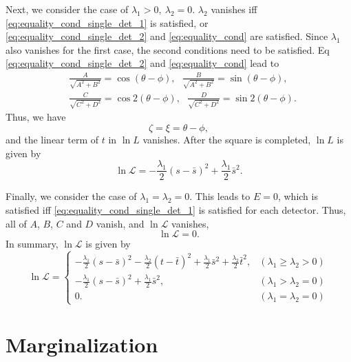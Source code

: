 \documentclass[12pt]{article}
\renewcommand{\L}{\mathcal{L}}
\begin{document}
Next, we consider the case of $\lambda_1>0,~\lambda_2=0$.
$\lambda_2$ vanishes iff \eqref{eq:equality_cond_single_det_1} is satisfied, or \eqref{eq:equality_cond_single_det_2} and \eqref{eq:equality_cond} are satisfied.
Since $\lambda_1$ also vanishes for the first case, the second conditions need to be satisfied.
Eq \eqref{eq:equality_cond_single_det_2} and \eqref{eq:equality_cond} lead to
\begin{align}
&\frac{A}{\sqrt{A^2+B^2}} = \cos (\theta - \phi),~~~\frac{B}{\sqrt{A^2+B^2}} = \sin (\theta - \phi), \\
&\frac{C}{\sqrt{C^2+D^2}} = \cos 2 (\theta - \phi),~~~\frac{D}{\sqrt{C^2+D^2}} = \sin 2 (\theta - \phi).
\end{align}
Thus, we have 
\begin{equation}
\zeta = \xi = \theta - \phi,
\end{equation}
and the linear term of $t$ in $\ln L$ vanishes.
After the square is completed, $\ln L$ is given by
\begin{equation}
\ln \L = - \frac{\lambda_1}{2} (s - \bar{s})^2 + \frac{\lambda_1}{2} \bar{s}^2.
\end{equation}

Finally, we consider the case of $\lambda_1=\lambda_2=0$. 
This leads to $E=0$, which is satisfied iff \eqref{eq:equality_cond_single_det_1} is satisfied for each detector.
Thus, all of $A$, $B$, $C$ and $D$ vanish, and $\ln \L$ vanishes,
\begin{equation}
\ln \L = 0.
\end{equation}
In summary, $\ln \L$ is given by
\begin{equation}
\ln \L = \begin{cases}
- \frac{\lambda_1}{2} (s - \bar{s})^2 - \frac{\lambda_2}{2} (t - \bar{t})^2 + \frac{\lambda_1}{2} \bar{s}^2 + \frac{\lambda_2}{2} \bar{t}^2, & (\lambda_1\geq\lambda_2>0) \\
- \frac{\lambda_1}{2} (s - \bar{s})^2 + \frac{\lambda_1}{2} \bar{s}^2, & (\lambda_1>\lambda_2=0) \\
0. & (\lambda_1=\lambda_2=0)
\end{cases}
\end{equation}


\section{Marginalization}
\end{document}
